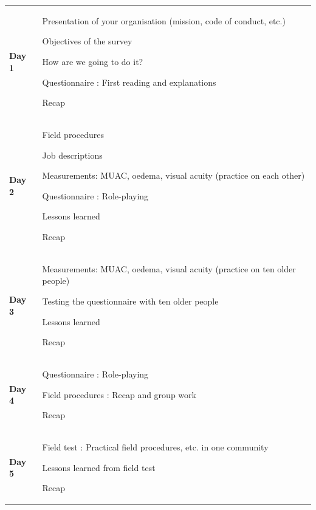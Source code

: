 \documentclass[12pt,a4paper]{book}
\theoremstyle{definition}
\theoremstyle{definition}
\theoremstyle{definition}
\theoremstyle{remark}
\begin{document}
\begin{longtable}[]{@{}ll@{}}
\toprule
\begin{minipage}[t]{0.48\columnwidth}\raggedright
\textbf{Day 1}\strut
\end{minipage} & \begin{minipage}[t]{0.48\columnwidth}\raggedright
Presentation of your organisation (mission, code of conduct, etc.)

Objectives of the survey

How are we going to do it?

Questionnaire : First reading and explanations

Recap\strut
\end{minipage}\tabularnewline
\begin{minipage}[t]{0.48\columnwidth}\raggedright
\textbf{Day 2}\strut
\end{minipage} & \begin{minipage}[t]{0.48\columnwidth}\raggedright
Field procedures

Job descriptions

Measurements: MUAC, oedema, visual acuity (practice on each other)

Questionnaire : Role-playing

Lessons learned

Recap\strut
\end{minipage}\tabularnewline
\begin{minipage}[t]{0.48\columnwidth}\raggedright
\textbf{Day 3}\strut
\end{minipage} & \begin{minipage}[t]{0.48\columnwidth}\raggedright
Measurements: MUAC, oedema, visual acuity (practice on ten older people)

Testing the questionnaire with ten older people

Lessons learned

Recap\strut
\end{minipage}\tabularnewline
\begin{minipage}[t]{0.48\columnwidth}\raggedright
\textbf{Day 4}\strut
\end{minipage} & \begin{minipage}[t]{0.48\columnwidth}\raggedright
Questionnaire : Role-playing

Field procedures : Recap and group work

Recap\strut
\end{minipage}\tabularnewline
\begin{minipage}[t]{0.48\columnwidth}\raggedright
\textbf{Day 5}\strut
\end{minipage} & \begin{minipage}[t]{0.48\columnwidth}\raggedright
Field test : Practical field procedures, etc. in one community

Lessons learned from field test

Recap\strut
\end{minipage}\tabularnewline
\bottomrule
\end{longtable}
\end{document}
